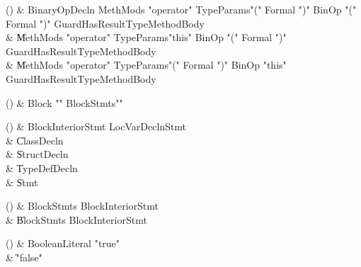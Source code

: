 \begin{bbgrammarappendix}

() & BinaryOpDecln \label{prod:BinaryOpDecln}  \: MethMods \xcd"operator" TypeParams\opt \xcd"(" Formal  \xcd")" BinOp \xcd"(" Formal  \xcd")" Guard\opt HasResultType\opt MethodBody  \\

 &    \| MethMods \xcd"operator" TypeParams\opt \xcd"this" BinOp \xcd"(" Formal  \xcd")" Guard\opt HasResultType\opt MethodBody \\
 &    \| MethMods \xcd"operator" TypeParams\opt \xcd"(" Formal  \xcd")" BinOp \xcd"this" Guard\opt HasResultType\opt MethodBody \\

\end{bbgrammarappendix}

\begin{bbgrammarappendix}

() & Block \label{prod:Block}  \: \xcd"{" BlockStmts\opt \xcd"}"  \\


\end{bbgrammarappendix}

\begin{bbgrammarappendix}

() & BlockInteriorStmt \label{prod:BlockInteriorStmt}  \: LocVarDeclnStmt  \\

 &    \| ClassDecln \\
 &    \| StructDecln \\
 &    \| TypeDefDecln \\
 &    \| Stmt \\

\end{bbgrammarappendix}

\begin{bbgrammarappendix}

() & BlockStmts \label{prod:BlockStmts}  \: BlockInteriorStmt  \\

 &    \| BlockStmts BlockInteriorStmt \\

\end{bbgrammarappendix}

\begin{bbgrammarappendix}

() & BooleanLiteral \label{prod:BooleanLiteral}  \: \xcd"true"   \\

 &    \| \xcd"false"  \\

\end{bbgrammarappendix}

